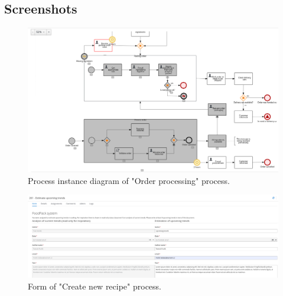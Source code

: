 \documentclass[11pt,a4paper]{article}
\begin{document}

\subsection{Screenshots}

\begin{figure}[H]
    \centering
    \includegraphics[width=\textwidth]{testing1.png}
    \caption{Process instance diagram of "Order processing" process.}
\end{figure}

\begin{figure}[H]
    \centering
    \includegraphics[width=\textwidth]{testing5.png}
    \caption{Form of "Create new recipe" process.}
\end{figure}
\end{document}

